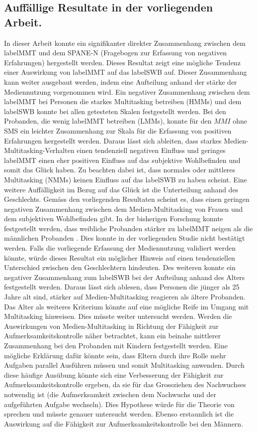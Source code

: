 \subsection{Auffällige Resultate in der vorliegenden Arbeit.}
In dieser Arbeit konnte ein signifikanter direkter Zusammenhang zwischen dem \gls{labelMMT} und dem SPANE-N (Fragebogen zur Erfassung von negativen Erfahrungen) hergestellt werden. Dieses Resultat zeigt eine mögliche Tendenz einer Auswirkung von \gls{labelMMT} auf das \gls{labelSWB} auf. Dieser Zusammenhang kann weiter ausgebaut werden, indem eine Aufteilung anhand der stärke der Mediennutzung vorgenommen wird. Ein negativer Zusammenhang zwischen dem \gls{labelMMT} bei Personen die starkes Multitasking betreiben (HMMs) und dem \gls{labelSWB} konnte bei allen getesteten Skalen festgestellt werden. Bei den Probanden, die wenig \gls{labelMMT} betreiben (LMMs), konnte für den $MMI$ ohne SMS ein leichter Zusammenhang zur Skala für die Erfassung von positiven Erfahrungen hergestellt werden. Daraus lässt sich ableiten, dass starkes Medien-Multitasking-Verhalten einen tendenziell negativen Einfluss und geringes \gls{labelMMT} einen eher positiven Einfluss auf das subjektive Wohlbefinden und somit das Glück haben. Zu beachten dabei ist, dass normales oder mittleres Multitasking (NMMs) keinen Einfluss auf das \gls{labelSWB} zu haben scheint. Eine weitere Auffälligkeit im Bezug auf das Glück ist die Unterteilung anhand des Geschlechts. Gemäss den vorliegenden Resultaten scheint es, dass einen geringen negativen Zusammenhang zwischen dem Medien-Multitasking von Frauen und dem subjektiven Wohlbefinden gibt. In der bisherigen Forschung konnte festgestellt werden, dass weibliche Probanden stärker zu \gls{labelMMT} neigen als die männlichen Probanden \cite{Rideout2010}. Dies konnte in der vorliegenden Studie nicht bestätigt werden. Falls die vorliegende Erfassung der Mediennutzung validiert werden könnte, würde dieses Resultat ein möglicher Hinweis auf einen tendenziellen Unterschied zwischen den Geschlechtern hindeuten. Des weiteren konnte ein negativer Zusammenhang zum \gls{labelSWB} bei der Aufteilung anhand des Alters festgestellt werden. Daraus lässt sich ablesen, dass Personen die jünger als 25 Jahre alt sind, stärker auf Medien-Multitasking reagieren als ältere Probanden. Das Alter als weiteres Kriterium könnte auf eine mögliche Reife im Umgang mit Multitasking hinweisen. Dies müsste weiter untersucht werden. Werden die Auswirkungen von Medien-Multitasking in Richtung der Fähigkeit zur Aufmerksamkeitskontrolle näher betrachtet, kann ein beinahe mittlerer Zusammenhang bei den Probanden mit Kindern festgestellt werden. Eine mögliche Erklärung dafür könnte sein, dass Eltern durch ihre Rolle mehr Aufgaben parallel Ausführen müssen und somit Multitasking anwenden. Durch diese häufige Ausübung könnte sich eine Verbesserung der Fähigkeit zur Aufmerksamkeitskontrolle ergeben, da sie für das Grossziehen des Nachwuchses notwendig ist (die Aufmerksamkeit zwischen dem Nachwuchs und der aufgeführten Aufgabe wechseln). Dies Hypothese würde für die Theorie von  sprechen und müsste genauer untersucht werden. Ebenso erstaunlich ist die Auswirkung auf die Fähigkeit zur Aufmerksamkeitskontrolle bei den Männern. 